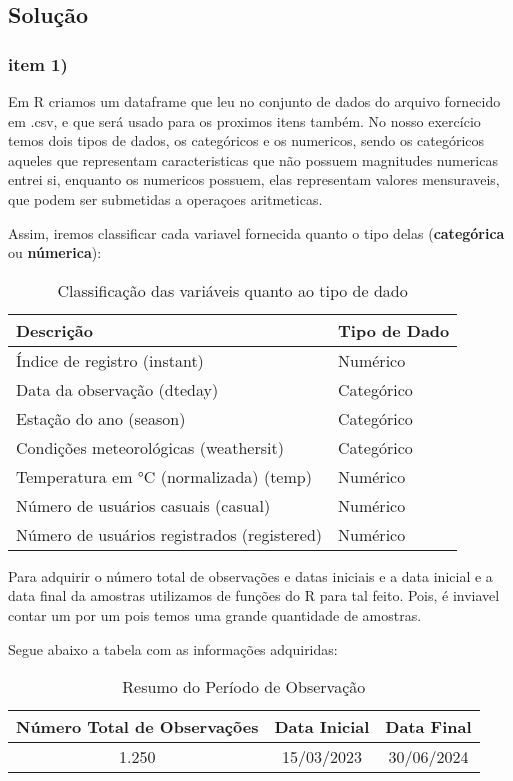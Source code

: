 \documentclass[a4paper,11pt]{article}
\begin{document}
\subsection{Solução}
\subsubsection{item 1)}

Em R criamos um dataframe que leu no conjunto de dados do arquivo fornecido em .csv, e que será usado para os proximos itens também. No nosso exercício temos dois tipos de dados, os categóricos e os numericos, sendo os categóricos aqueles que representam caracteristicas que não possuem magnitudes numericas entrei si, enquanto os numericos possuem, elas representam valores mensuraveis, que podem ser submetidas a operaçoes aritmeticas.

Assim, iremos classificar cada variavel fornecida quanto o tipo delas (\textbf{categórica} ou \textbf{númerica}):

\begin{table}[h!]
\centering
\caption{Classificação das variáveis quanto ao tipo de dado}
\begin{tabular}{|l|l|}
\hline
\textbf{Descrição} & \textbf{Tipo de Dado} \\ \hline
Índice de registro (instant) & Numérico \\ \hline
Data da observação (dteday) & Categórico \\ \hline
Estação do ano (season) & Categórico \\ \hline
Condições meteorológicas (weathersit) & Categórico \\ \hline
Temperatura em °C (normalizada) (temp) & Numérico \\ \hline
Número de usuários casuais (casual) & Numérico \\ \hline
Número de usuários registrados (registered) & Numérico \\ \hline
\end{tabular}
\end{table}

Para adquirir o número total de observações e datas iniciais e a data inicial e a data final da amostras utilizamos de funções do R para tal feito. Pois, é inviavel contar um por um pois temos uma grande quantidade de amostras. 

Segue abaixo a tabela com as informações adquiridas:

\begin{table}[h]
\centering
\caption{Resumo do Período de Observação}
\label{tab:resumo_observacao}
\begin{tabular}{|c|c|c|}
\hline
\textbf{Número Total de Observações} & \textbf{Data Inicial} & \textbf{Data Final} \\
\hline
1.250 & 15/03/2023 & 30/06/2024 \\
\hline
\end{tabular}
\end{table}
\end{document}
